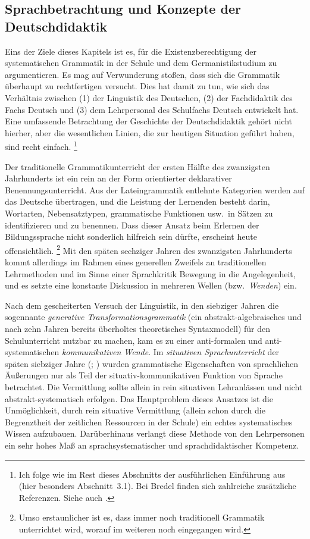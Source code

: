 \subsection{Sprachbetrachtung und Konzepte der Deutschdidaktik}
\label{sec:sprachbetrachtungundkonzeptederdeutschdidaktik}

Eins der Ziele dieses Kapitels ist es, für die Existenzberechtigung der systematischen Grammatik in der Schule und dem Germanistikstudium zu argumentieren.
Es mag auf Verwunderung stoßen, dass sich die Grammatik überhaupt zu rechtfertigen versucht.
Dies hat damit zu tun, wie sich das Verhältnis zwischen (1) der Linguistik des Deutschen, (2) der Fachdidaktik des Fachs Deutsch und (3) dem Lehrpersonal des Schulfachs Deutsch entwickelt hat.
Eine umfassende Betrachtung der Geschichte der Deutschdidaktik gehört nicht hierher, aber die wesentlichen Linien, die zur heutigen Situation geführt haben, sind recht einfach.%
\footnote{Ich folge wie im Rest dieses Abschnitts der ausführlichen Einführung aus \citet{Bredel2013} (hier besonders Abschnitt~3.1).
Bei Bredel finden sich zahlreiche zusätzliche Referenzen.
Siehe auch \citet{Gornik2003}.}

Der {traditionelle Grammatikunterricht} der ersten Hälfte des zwanzigsten Jahrhunderts ist ein rein an der Form orientierter deklarativer Benennungsunterricht.
Aus der Lateingrammatik entlehnte Kategorien werden auf das Deutsche übertragen, und die Leistung der Lernenden besteht darin, Wortarten, Nebensatztypen, grammatische Funktionen usw.\ in Sätzen zu identifizieren und zu benennen.
Dass dieser Ansatz beim Erlernen der Bildungssprache nicht sonderlich hilfreich sein dürfte, erscheint heute offensichtlich.%
\footnote{Umso erstaunlicher ist es, dass immer noch traditionell Grammatik unterrichtet wird, worauf im weiteren noch eingegangen wird.}
Mit den späten sechziger Jahren des zwanzigsten Jahrhunderts kommt allerdings im Rahmen eines generellen Zweifels an traditionellen Lehrmethoden und im Sinne einer Sprachkritik Bewegung in die Angelegenheit, und es setzte eine konstante Diskussion in mehreren Wellen (bzw.\ \textit{Wenden}) ein.

Nach dem gescheiterten Versuch der Linguistik, in den siebziger Jahren die sogennante \textit{generative Transformationsgrammatik} (ein abstrakt-algebraisches und nach zehn Jahren bereits überholtes theoretisches Syntaxmodell) für den Schulunterricht nutzbar zu machen, kam es zu einer anti-formalen und anti-systematischen \textit{kommunikativen Wende}.
Im \textit{situativen Sprachunterricht} der späten siebziger Jahre (\citealt[229--232]{Bredel2013}; \citealt{BoettcherSitta1978}) wurden grammatische Eigenschaften von sprachlichen Äußerungen nur als Teil der situativ-kommunikativen Funktion von Sprache betrachtet.
Die Vermittlung sollte allein in rein situativen Lehranlässen und nicht abstrakt-systematisch erfolgen.
Das Hauptproblem dieses Ansatzes ist die Unmöglichkeit, durch rein situative Vermittlung (allein schon durch die Begrenztheit der zeitlichen Ressourcen in der Schule) ein echtes systematisches Wissen aufzubauen.
Darüberhinaus verlangt diese Methode von den Lehrpersonen ein sehr hohes Maß an sprachsystematischer und sprachdidaktischer Kompetenz.

